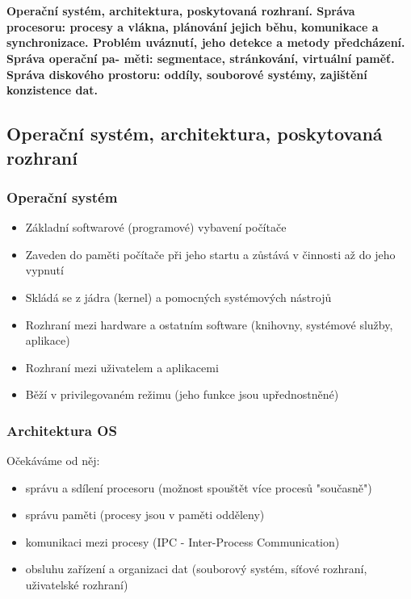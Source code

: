 \documentclass[10pt,a4paper]{article}
\begin{document}
\section{}
\paragraph{Operační systém, architektura, poskytovaná rozhraní. Správa procesoru: procesy a vlákna, plánování jejich
běhu, komunikace a synchronizace. Problém uváznutí, jeho detekce a metody předcházení. Správa operační pa-
měti: segmentace, stránkování, virtuální paměť. Správa diskového prostoru: oddíly, souborové systémy, zajištění
konzistence dat.}


\subsection{Operační systém, architektura, poskytovaná rozhraní}

\subsubsection{Operační systém}
\begin{itemize}
	\item Základní softwarové (programové) vybavení počítače
	\item Zaveden do paměti počítače při jeho startu a zůstává v činnosti až do jeho vypnutí
	\item Skládá se z jádra (kernel) a pomocných systémových nástrojů
	\item Rozhraní mezi hardware a ostatním software (knihovny, systémové služby, aplikace)
	\item Rozhraní mezi uživatelem a aplikacemi
	\item Běží v privilegovaném režimu (jeho funkce jsou upřednostněné)
\end{itemize}

\subsubsection{Architektura OS}
Očekáváme od něj:
\begin{itemize}
	\item správu a sdílení procesoru (možnost spouštět více procesů "současně")
	\item správu paměti (procesy jsou v paměti odděleny)
	\item komunikaci mezi procesy (IPC - Inter-Process Communication)
	\item obsluhu zařízení a organizaci dat (souborový systém, síťové rozhraní, uživatelské rozhraní)
\end{itemize}
\end{document}
